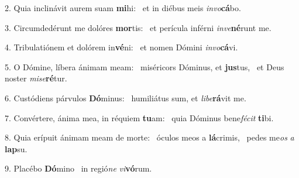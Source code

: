 2. Quia inclinávit aurem suam \textbf{mi}hi: \ast\  et in diébus meis \textit{in}\textit{vo}\textbf{cá}bo.\

3. Circumdedérunt me dolóres \textbf{mor}tis: \ast\  et perícula inférni \textit{in}\textit{ve}\textbf{né}runt me.\

4. Tribulatiónem et dolórem in\textbf{vé}ni: \ast\  et nomen Dómini \textit{in}\textit{vo}\textbf{cá}vi.\

5. O Dómine, líbera ánimam meam: \dag\  miséricors Dóminus, et \textbf{jus}tus, \ast\  et Deus noster \textit{mi}\textit{se}\textbf{ré}tur.\

6. Custódiens párvulos \textbf{Dó}minus: \ast\  humiliátus sum, et \textit{li}\textit{be}\textbf{rá}vit me.\

7. Convértere, ánima mea, in réquiem \textbf{tu}am: \ast\  quia Dóminus bene\textit{fé}\textit{cit} \textbf{ti}bi.\

8. Quia erípuit ánimam meam de morte: \dag\  óculos meos a \textbf{lá}crimis, \ast\  pedes me\textit{os} \textit{a} \textbf{lap}su.\

9. Placébo \textbf{Dó}mino \ast\  in regió\textit{ne} \textit{vi}\textbf{vó}rum.\


